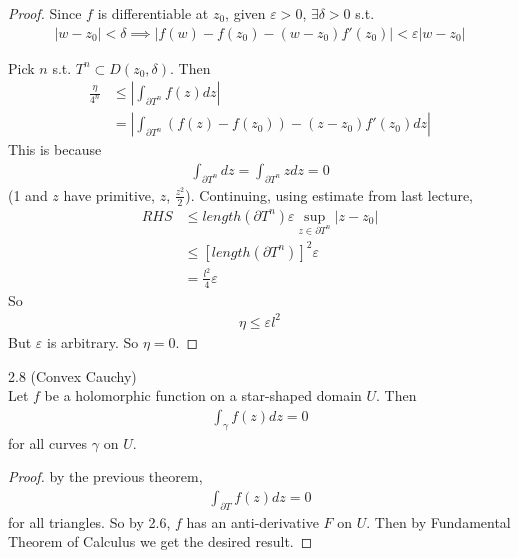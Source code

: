 \documentclass[a4paper]{article}
\begin{document}
\begin{thm}
\begin{proof}
Since $f$ is differentiable at $z_0$, given $\varepsilon>0$, $\exists \delta>0$ s.t.
\begin{equation*}
\begin{aligned}
|w-z_0|<\delta \implies |f(w)-f(z_0) - (w-z_0)f'(z_0)| < \varepsilon|w-z_0|
\end{aligned}
\end{equation*}

Pick $n$ s.t. $T^n \subset D(z_0,\delta)$. Then
\begin{equation*}
\begin{aligned}
\frac{\eta}{4^n} &\leq \left|\int_{\partial T^n} f(z) dz\right|\\
&= \left|\int_{\partial T^n} (f(z)-f(z_0))-(z-z_0)f'(z_0)dz\right|
\end{aligned}
\end{equation*}
This is because
\begin{equation*}
\begin{aligned}
\int_{\partial T^n} dz = \int_{\partial T^n} zdz = 0
\end{aligned}
\end{equation*}
(1 and $z$ have primitive, $z$, $\frac{z^2}{2}$). Continuing, using estimate from last lecture,
\begin{equation*}
\begin{aligned}
RHS &\leq length(\partial T^n) \varepsilon \sup_{z \in \partial T^n} |z-z_0|\\
&\leq [length(\partial T^n)]^2 \varepsilon \\
&= \frac{l^2}{4}\varepsilon
\end{aligned}
\end{equation*}
So
\begin{equation*}
\begin{aligned}
\eta \leq \varepsilon l^2
\end{aligned}
\end{equation*}
But $\varepsilon$ is arbitrary. So $\eta = 0$.
\end{proof}
\end{thm}

\begin{coro} 2.8 (Convex Cauchy)\\
Let $f$ be a holomorphic function on a star-shaped domain $U$. Then
\begin{equation*}
\begin{aligned}
\int_\gamma f(z) dz = 0
\end{aligned}
\end{equation*}
for all curves $\gamma$ on $U$.
\begin{proof}
by the previous theorem,
\begin{equation*}
\begin{aligned}
\int_{\partial T} f(z) dz = 0
\end{aligned}
\end{equation*}
for all triangles. So by 2.6, $f$ has an anti-derivative $F$ on $U$. Then by Fundamental Theorem of Calculus we get the desired result.
\end{proof}
\end{coro}
\end{document}
